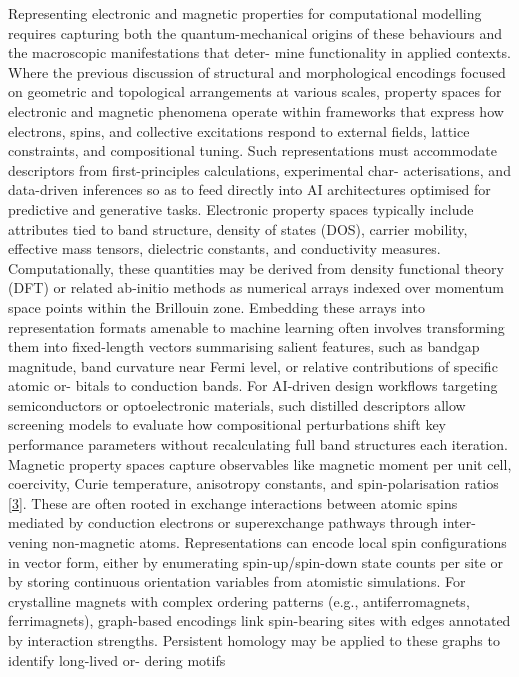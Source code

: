 \documentclass[
]{article}
\begin{document}
Representing electronic and magnetic properties for computational
modelling requires capturing both the quantum-mechanical origins of
these behaviours and the macroscopic manifestations that deter- mine
functionality in applied contexts. Where the previous discussion of
structural and morphological encodings focused on geometric and
topological arrangements at various scales, property spaces for
electronic and magnetic phenomena operate within frameworks that express
how electrons, spins, and collective excitations respond to external
fields, lattice constraints, and compositional tuning. Such
representations must accommodate descriptors from first-principles
calculations, experimental char- acterisations, and data-driven
inferences so as to feed directly into AI architectures optimised for
predictive and generative tasks. Electronic property spaces typically
include attributes tied to band structure, density of states (DOS),
carrier mobility, effective mass tensors, dielectric constants, and
conductivity measures. Computationally, these quantities may be derived
from density functional theory (DFT) or related ab-initio methods as
numerical arrays indexed over momentum space points within the Brillouin
zone. Embedding these arrays into representation formats amenable to
machine learning often involves transforming them into fixed-length
vectors summarising salient features, such as bandgap magnitude, band
curvature near Fermi level, or relative contributions of specific atomic
or- bitals to conduction bands. For AI-driven design workflows targeting
semiconductors or optoelectronic materials, such distilled descriptors
allow screening models to evaluate how compositional perturbations shift
key performance parameters without recalculating full band structures
each iteration. Magnetic property spaces capture observables like
magnetic moment per unit cell, coercivity, Curie temperature, anisotropy
constants, and spin-polarisation ratios
{[}\protect\hyperlink{_bookmark43}{3}{]}. These are often rooted in
exchange interactions between atomic spins mediated by conduction
electrons or superexchange pathways through inter- vening non-magnetic
atoms. Representations can encode local spin configurations in vector
form, either by enumerating spin-up/spin-down state counts per site or
by storing continuous orientation variables from atomistic simulations.
For crystalline magnets with complex ordering patterns (e.g.,
antiferromagnets, ferrimagnets), graph-based encodings link spin-bearing
sites with edges annotated by interaction strengths. Persistent homology
may be applied to these graphs to identify long-lived or- dering motifs
\end{document}
